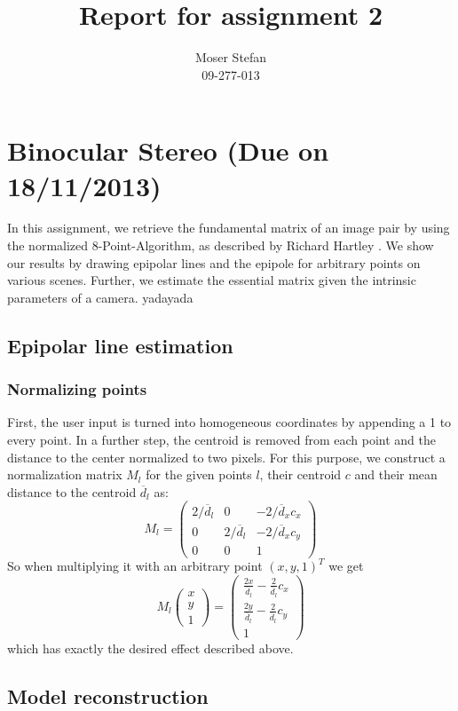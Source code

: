 \documentclass{paper}
\title{Report for assignment 2}
\author{Moser Stefan\\09-277-013}
\begin{document}
\maketitle

\section{Binocular Stereo (Due on 18/11/2013)}

In this assignment, we retrieve the fundamental matrix of an image pair by using the normalized 8-Point-Algorithm, as described by Richard Hartley \cite{601246}. We show our results by drawing epipolar lines and the epipole for arbitrary points on various scenes. Further, we estimate the essential matrix given the intrinsic parameters of a camera. yadayada

\subsection{Epipolar line estimation}

\subsubsection{Normalizing points}

First, the user input is turned into homogeneous coordinates by appending a 1 to every point. 
In a further step, the centroid is removed from each point and the distance to the center normalized to two pixels. For this purpose, we construct a normalization matrix $M_l$ for the given points $l$, their centroid $c$ and their mean distance to the centroid $\overline{d}_l$ as:
\begin{equation}
M_l =
\begin{pmatrix}
	2/\overline{d}_l & 0 & -2/\overline{d}_x c_x \\
	0 & 2/\overline{d}_l & -2/\overline{d}_x c_y \\
	0 & 0 & 1
\end{pmatrix}
\end{equation}
So when multiplying it with an arbitrary point $(x,y,1)^T$ we get
\begin{equation}
M_l \begin{pmatrix}
 x \\
 y \\
 1
\end{pmatrix}
 = \begin{pmatrix}
 	\frac{2x}{\overline{d}_l} - \frac{2}{\overline{d}_l}c_x \\
 	\frac{2y}{\overline{d}_l} - \frac{2}{\overline{d}_l}c_y \\
 	1
 \end{pmatrix}
\end{equation}
which has exactly the desired effect described above. 
\subsection{Model reconstruction}


\end{document}
